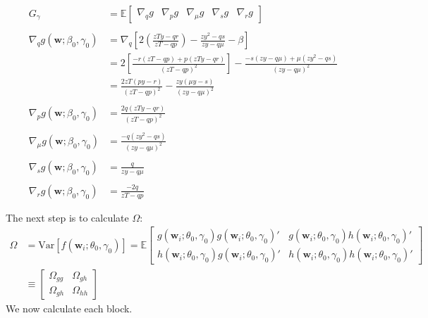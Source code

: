\documentclass[12pt]{article}
\begin{document}
\begin{align*}
  G_\gamma &= \mathbb{E}
  \left[
  \begin{array}{ccccc}
    \nabla_q g & \nabla_p g & \nabla_\mu g & \nabla_s g & \nabla_r g
  \end{array}
\right] \\ \\
  \nabla_q g(\mathbf{w};\beta_0, \gamma_0) &= \nabla_q \left[ 2\left(\frac{zTy - qr}{zT - qp}\right) - \frac{zy^2 - qs}{zy - q\mu} - \beta \right]\\
  &= 2\left[ \frac{-r(zT - qp) + p(zTy - qr)}{(zT - qp)^2} \right] - \frac{-s(zy - q\mu) + \mu (zy^2 - qs)}{(zy - q\mu)^2}\\
  &=  \frac{2zT(py - r)}{(zT - qp)^2}  - \frac{zy (\mu y - s)  }{(zy - q\mu)^2}\\ \\
  \nabla_p g(\mathbf{w};\beta_0, \gamma_0) &= \frac{2q(zTy - qr)}{(zT - qp)^2} \\ \\
  \nabla_\mu g(\mathbf{w};\beta_0, \gamma_0) &= \frac{-q(zy^2 - qs)}{(zy - q\mu)^2}\\ \\
  \nabla_s g(\mathbf{w};\beta_0, \gamma_0) &= \frac{q}{zy - q\mu} \\ \\
  \nabla_r g(\mathbf{w};\beta_0, \gamma_0) &= \frac{-2q}{zT - qp}
\end{align*}

The next step is to calculate $\Omega$:
\begin{align*}
  \Omega &= \mbox{Var}\left[ f(\mathbf{w}_i; \theta_0, \gamma_0) \right] 
  =\mathbb{E}
  \left[
  \begin{array}{cc}
    g(\mathbf{w}_i;\theta_0, \gamma_0)g(\mathbf{w}_i;\theta_0, \gamma_0)' &
    g(\mathbf{w}_i;\theta_0, \gamma_0)h(\mathbf{w}_i;\theta_0, \gamma_0)' \\
    h(\mathbf{w}_i;\theta_0, \gamma_0)g(\mathbf{w}_i;\theta_0, \gamma_0)' &
    h(\mathbf{w}_i;\theta_0, \gamma_0)h(\mathbf{w}_i;\theta_0, \gamma_0)'
  \end{array}
\right]\\ &\equiv
\left[
\begin{array}{cc}
  \Omega_{gg} & \Omega_{gh}\\
  \Omega_{gh} & \Omega_{hh}
\end{array}
\right]
\end{align*}
We now calculate each block.
\end{document}
